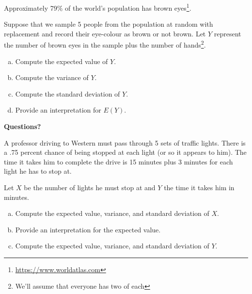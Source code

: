 \begin{frame}

  \begin{block}{\example}
    Approximately 79\% of the world's population has brown eyes\footnote{\url{https://www.worldatlas.com}}.

    \medskip
    
    Suppose that we sample 5 people from the population at random with replacement and record their eye-colour as brown or not brown. Let $Y$ represent the number of brown eyes in the sample plus the number of hands\footnote{We'll assume that everyone has two of each}.

    \medskip

    \begin{enumerate}[a)]
    \item Compute the expected value of $Y$. 
    \item Compute the variance of $Y$.
    \item Compute the standard deviation of $Y$.
    \item Provide an interpretation for $E(Y)$.
    \end{enumerate} 
  \end{block}
\end{frame}

\begin{frame}

  \begin{center}
    \Large{\textbf{Questions?}}
  \end{center}
\end{frame}

\begin{frame}
  \begin{block}{\exercise}
  
  A professor driving to Western must pass through 5 sets of traffic lights. There is a .75 percent chance of being stopped at each light (or so it appears to him). The time it takes him to complete the drive is 15 minutes plus 3 minutes for each light he has to stop at. 

    Let $X$ be the number of lights he must stop at and $Y$ the time it takes him in minutes.
    \begin{enumerate}[a)]
    \item Compute the expected value, variance, and standard deviation of $X$.
    \item Provide an interpretation for the expected value.
    \item Compute the expected value, variance, and standard deviation of $Y$.
    \end{enumerate}
  \end{block}
\end{frame}


